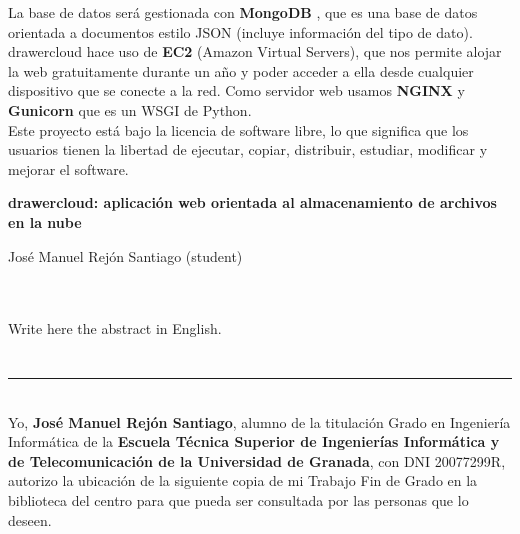 La base de datos será gestionada con \textbf{MongoDB} \cite{cita9}, que es una base de datos orientada a documentos estilo JSON (incluye información del tipo de dato). \\

drawercloud hace uso de \textbf{EC2} \cite{cita_ec2} (Amazon Virtual Servers), que nos permite alojar la web gratuitamente durante un año y poder acceder a ella desde cualquier dispositivo que se conecte a la red. Como servidor web usamos \textbf{NGINX} \cite{cita_nginx} y \textbf{Gunicorn} \cite{cita_gunicorn} que es un WSGI de Python.\\

Este proyecto está bajo la licencia de software libre, lo que significa que los usuarios tienen la libertad de ejecutar, copiar, distribuir, estudiar, modificar y mejorar el software.

\clearpage


\thispagestyle{empty}


\begin{center}
{\large\bfseries drawercloud: aplicación web orientada al almacenamiento de archivos en la nube}\\
\end{center}
\begin{center}
José Manuel Rejón Santiago (student)\\
\end{center}

\\

\vspace{0.7cm}
\\

Write here the abstract in English.

\chapter*{}
\thispagestyle{empty}

\noindent\rule[-1ex]{\textwidth}{2pt}\\[4.5ex]

Yo, \textbf{José Manuel Rejón Santiago}, alumno de la titulación Grado en Ingeniería Informática de la \textbf{Escuela Técnica Superior
de Ingenierías Informática y de Telecomunicación de la Universidad de Granada}, con DNI 20077299R, autorizo la
ubicación de la siguiente copia de mi Trabajo Fin de Grado en la biblioteca del centro para que pueda ser
consultada por las personas que lo deseen.

